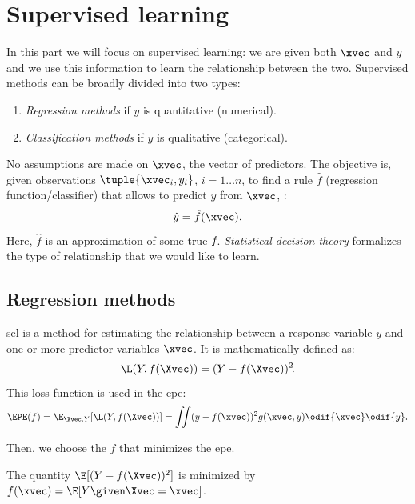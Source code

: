 \chapter{Supervised learning}

In this part we will focus on supervised learning: we are given both $\xvec$ and $y$ and we use this information to learn the relationship between the two. Supervised methods can be broadly divided into two types:
\begin{enumerate}
    \item \emph{Regression methods} if $y$ is quantitative (numerical).
    \item \emph{Classification methods} if $y$ is qualitative (categorical).
\end{enumerate}

No assumptions are made on $\xvec$, the vector of predictors. The objective is, given observations $\tuple{\xvec_i, y_i}$, $i = 1\ldots n$, to find a rule $\hat{f}$ (regression function/classifier) that allows to predict $y$ from $\xvec$, \ie:
\begin{equation}
    \hat{y} = \hat{f}(\xvec).
\end{equation}
Here, $\hat{f}$ is an approximation of some true $f\negthinspace$. \emph{Statistical decision theory} formalizes the type of relationship that we would like to learn.

\section{Regression methods}

\acf{sel} is a method for estimating the relationship between a response variable $y$ and one or more predictor variables $\xvec$. It is mathematically defined as:
\begin{equation}
    \L(Y\negthinspace, f(\Xvec)) = (Y - f(\Xvec))^2\negthinspace.
\end{equation}
This loss function is used in the \acf{epe}:
\begin{equation}
    \EPE(f) = \E_{\Xvec, Y}[\L(Y\negthinspace, f(\Xvec))] = \iint(y - f(\xvec))^2 g(\xvec, y) \odif{\xvec} \odif{y}.
\end{equation}

Then, we choose the $f$ that minimizes the \acf{epe}.

\begin{theorem*}
    The quantity $\E[(Y - f(\Xvec))^2]$ is minimized by $f(\xvec) = \E[Y \given \Xvec = \xvec]$.
\end{theorem*}

